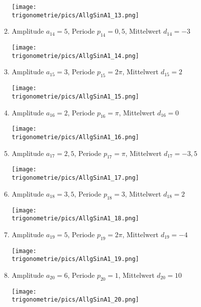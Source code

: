 \begin{Answer}[ref=allgSinCosA1]
\begin{enumerate}[label=\alph*)]
		\begin{minipage}{\textwidth}
			\texttt{[image: \\trigonometrie/pics/AllgSinA1\_13.png]}\\
		\end{minipage}	 
		\item Amplitude \(a_{14}=5\), Periode \(p_{14}=0,5\), Mittelwert \(d_{14}=-3\)\\
		\begin{minipage}{\textwidth}
			\texttt{[image: \\trigonometrie/pics/AllgSinA1\_14.png]}\\
		\end{minipage}	 
		\item Amplitude \(a_{15}=3\), Periode \(p_{15}=2\pi\), Mittelwert \(d_{15}=2\)\\
		\begin{minipage}{\textwidth}
			\texttt{[image: \\trigonometrie/pics/AllgSinA1\_15.png]}\\
		\end{minipage}	 
		\item Amplitude \(a_{16}=2\), Periode \(p_{16}=\pi\), Mittelwert \(d_{16}=0\)\\
		\begin{minipage}{\textwidth}
			\texttt{[image: \\trigonometrie/pics/AllgSinA1\_16.png]}\\
		\end{minipage}	 \newpage
		\item Amplitude \(a_{17}=2,5\), Periode \(p_{17}=\pi\), Mittelwert \(d_{17}=-3,5\)\\
		\begin{minipage}{\textwidth}
			\texttt{[image: \\trigonometrie/pics/AllgSinA1\_17.png]}\\
		\end{minipage}	 
		\item Amplitude \(a_{18}=3,5\), Periode \(p_{18}=3\), Mittelwert \(d_{18}=2\)\\
		\begin{minipage}{\textwidth}
			\texttt{[image: \\trigonometrie/pics/AllgSinA1\_18.png]}\\
		\end{minipage}	 
		\item Amplitude \(a_{19}=5\), Periode \(p_{19}=2\pi\), Mittelwert \(d_{19}=-4\)\\
		\begin{minipage}{\textwidth}
			\texttt{[image: \\trigonometrie/pics/AllgSinA1\_19.png]}\\
		\end{minipage}	 
		\item Amplitude \(a_{20}=6\), Periode \(p_{20}=1\), Mittelwert \(d_{20}=10\)\\
		\begin{minipage}{\textwidth}
			\texttt{[image: \\trigonometrie/pics/AllgSinA1\_20.png]}\\
		\end{minipage}	 
	\end{enumerate}
\end{Answer}
